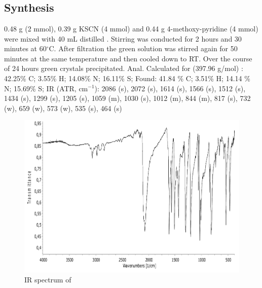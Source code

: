 \section{}
\subsection{Synthesis}
0.48 g  (2 mmol), 0.39 g KSCN (4 mmol) and 0.44 g 4-methoxy-pyridine (4 mmol) were mixed with 40 mL distilled . Stirring was conducted for 2 hours and 30 minutes at 60$^\circ$C. After filtration the green solution was stirred again for 50 minutes at the same temperature and then cooled down to RT. Over the course of 24 hours green crystals precipitated.
Anal. Calculated for  (397.96 g/mol) : 42.25\% C; 3.55\% H; 14.08\% N; 16.11\% S;
Found: 41.84 \% C; 3.51\% H; 14.14 \% N; 15.69\% S;
IR (ATR, cm$^{-1}$): 2086 (s), 2072 (s), 1614 (s), 1566 (s), 1512 (s), 1434 (s), 1299 (s), 1205 (s), 1059 (m), 1030 (s), 1012 (m), 844 (m), 817 (s), 732 (w), 659 (w), 573 (w), 535 (s), 464 (s)


\begin{figure}[h!]
\centering
\includegraphics[scale=0.9, width=1\textwidth]{figures/CuR4MOP-IR.pdf}
\caption{IR spectrum of }
\end{figure}


